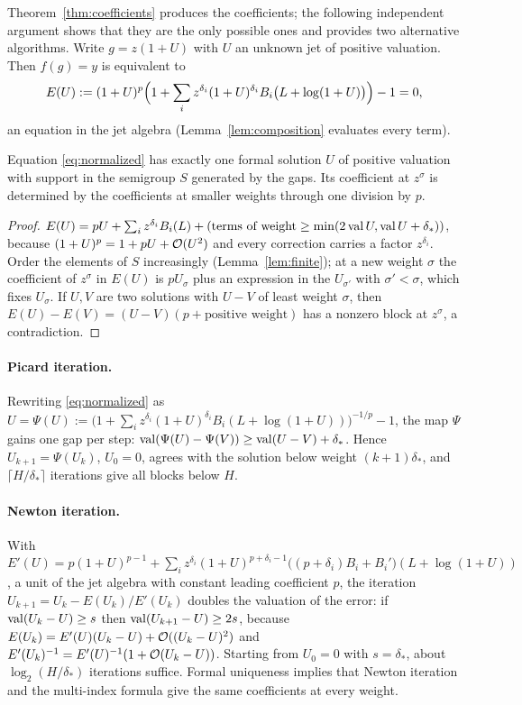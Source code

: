 Theorem~\ref{thm:coefficients} produces the coefficients; the following independent argument shows that they are the only possible ones and provides two alternative algorithms. Write $g=z(1+U)$ with $U$ an unknown jet of positive valuation. Then $f(g)=y$ is equivalent to
\begin{equation}
 E(U):=(1+U)^p\Bigl(1+\sum_iz^{\delta_i}(1+U)^{\delta_i}B_i\bigl(L+\log(1+U)\bigr)\Bigr)-1=0,
 \label{eq:normalized}
\end{equation}
an equation in the jet algebra (Lemma~\ref{lem:composition} evaluates every term).

\begin{proposition}
\label{prop:triangular}
Equation \eqref{eq:normalized} has exactly one formal solution $U$ of positive valuation with support in the semigroup $S$ generated by the gaps. Its coefficient at $z^\sigma$ is determined by the coefficients at smaller weights through one division by $p$.
\end{proposition}
\begin{proof}
$E(U)=pU+\sum_iz^{\delta_i}B_i(L)+(\text{terms of weight}\ge\min(2\operatorname{val} U,\operatorname{val} U+\delta_*))$, because $(1+U)^p=1+pU+\mathcal O(U^2)$ and every correction carries a factor $z^{\delta_i}$. Order the elements of $S$ increasingly (Lemma~\ref{lem:finite}); at a new weight $\sigma$ the coefficient of $z^\sigma$ in $E(U)$ is $pU_\sigma$ plus an expression in the $U_{\sigma'}$ with $\sigma'<\sigma$, which fixes $U_\sigma$. If $U,V$ are two solutions with $U-V$ of least weight $\sigma$, then $E(U)-E(V)=(U-V)(p+\text{positive weight})$ has a nonzero block at $z^\sigma$, a contradiction.
\end{proof}

\paragraph{Picard iteration.} Rewriting \eqref{eq:normalized} as $U=\Psi(U):=\bigl(1+\sum_iz^{\delta_i}(1+U)^{\delta_i}B_i(L+\log(1+U))\bigr)^{-1/p}-1$, the map $\Psi$ gains one gap per step: $\operatorname{val}(\Psi(U)-\Psi(V))\ge\operatorname{val}(U-V)+\delta_*$. Hence $U_{k+1}=\Psi(U_k)$, $U_0=0$, agrees with the solution below weight $(k+1)\delta_*$, and $\lceil H/\delta_*\rceil$ iterations give all blocks below $H$.

\paragraph{Newton iteration.} With $E'(U)=p(1+U)^{p-1}+\sum_iz^{\delta_i}(1+U)^{p+\delta_i-1}\bigl((p+\delta_i)B_i+B_i'\bigr)(L+\log(1+U))$, a unit of the jet algebra with constant leading coefficient $p$, the iteration $U_{k+1}=U_k-E(U_k)/E'(U_k)$ doubles the valuation of the error: if $\operatorname{val}(U_k-U)\ge s$ then $\operatorname{val}(U_{k+1}-U)\ge2s$, because $E(U_k)=E'(U)(U_k-U)+\mathcal O((U_k-U)^2)$ and $E'(U_k)^{-1}=E'(U)^{-1}(1+\mathcal O(U_k-U))$. Starting from $U_0=0$ with $s=\delta_*$, about $\log_2(H/\delta_*)$ iterations suffice. Formal uniqueness implies that Newton iteration and the multi-index formula give the same coefficients at every weight.
